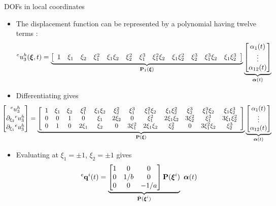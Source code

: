 \documentclass[aspectratio=169]{beamer}
\begin{document}
\begin{frame}{DOFs in local coordinates}
  \vspace{-0.1cm}
  \begin{itemize}
    \small
    \item The displacement function can be represented by a polynomial having twelve terms :
          $${}^eu_3^h(\boldxi,t) =\underbrace{\left[\begin{array}{cccccccccccc}
                  1 & \xi_1 & \xi_2 & \xi_1^2 & \xi_1\xi_2 & \xi_2^2 & \xi_1^3 & \xi_1^2\xi_2 & \xi_1\xi_2^2 & \xi_2^3 & \xi_1^3\xi_2 & \xi_1\xi_2^3
                \end{array}\right]}_\text{$\mathbf{P}_1(\boldxi)$}\underbrace{\begin{bmatrix}
                \alpha_1(t) \\
                \vdots      \\
                \alpha_{12}(t)
              \end{bmatrix}}_\text{$\boldsymbol{\alpha}(t)$}   \vspace{-0.4cm}$$
    \item Differentiating gives
          $$\hspace{-0.8cm}
            \begin{bmatrix}
              {}^eu_3^h \\[2pt] \partial_{\xi_2}{}^eu_3^h\\[2pt] \partial_{\xi_1}{}^eu_3^h
            \end{bmatrix}  =\underbrace{\left[\begin{array}{cccccccccccc}
                  1 & \xi_1 & \xi_2 & \xi_1^2 & \xi_1\xi_2 & \xi_2^2 & \xi_1^3  & \xi_1^2\xi_2 & \xi_1\xi_2^2 & \xi_2^3  & \xi_1^3\xi_2  & \xi_1\xi_2^3  \\
                  0 & 0     & 1     & 0       & \xi_1      & 2\xi_2  & 0        & \xi_1^2      & 2\xi_1\xi_2  & 3\xi_2^2 & \xi_1^3       & 3\xi_1\xi_2^2 \\
                  0 & 1     & 0     & 2\xi_1  & \xi_2      & 0       & 3\xi_1^2 & 2\xi_1\xi_2  & \xi_2^2      & 0        & 3\xi_1^2\xi_2 & \xi_2^3
                \end{array}\right]}_\text{$\mathbf{P}(\boldxi)$}\underbrace{\begin{bmatrix}
                \alpha_1(t) \\
                \vdots      \\
                \alpha_{12}(t)
              \end{bmatrix}}_\text{$\boldsymbol{\alpha}(t)$}
            \vspace{-0.2cm}$$
    \item Evaluating at $\xi_1 = \pm 1$, $\xi_2 = \pm 1$ gives
          $$\ {}^e\mathbf  q^i(t)=\underbrace{\begin{bmatrix}
                1 & 0   & 0    \\
                0 & 1/b & 0    \\
                0 & 0   & -1/a
              \end{bmatrix}\mathbf P(\boldxi^i)}_\text{$\bar{\mathbf P}(\boldxi^i)$}\ \boldsymbol{\alpha}(t)$$
  \end{itemize}
\end{frame}
\end{document}
